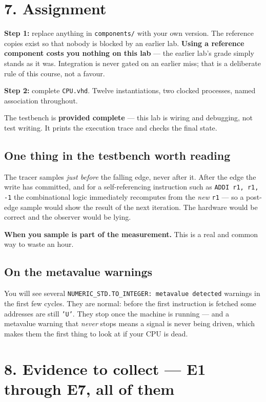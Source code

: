 \documentclass[11pt]{article}
\newcommand{\code}[1]{\texttt{#1}}
\begin{document}
\section*{7. Assignment}

\textbf{Step 1:} replace anything in \code{components/} with your own version.
The reference copies exist so that nobody is blocked by an earlier lab.
\textbf{Using a reference component costs you nothing on this lab} --- the
earlier lab's grade simply stands as it was. Integration is never gated on an
earlier miss; that is a deliberate rule of this course, not a favour.

\textbf{Step 2:} complete \code{CPU.vhd}. Twelve instantiations, two clocked
processes, named association throughout.

The testbench is \textbf{provided complete} --- this lab is wiring and
debugging, not test writing. It prints the execution trace and checks the final
state.

\subsection*{One thing in the testbench worth reading}

The tracer samples \emph{just before} the falling edge, never after it. After
the edge the write has committed, and for a self-referencing instruction such as
\code{ADDI r1, r1, -1} the combinational logic immediately recomputes from the
\emph{new} \code{r1} --- so a post-edge sample would show the result of the next
iteration. The hardware would be correct and the observer would be lying.

\textbf{When you sample is part of the measurement.} This is a real and common
way to waste an hour.

\subsection*{On the metavalue warnings}

You will see several \code{NUMERIC\_STD.TO\_INTEGER: metavalue detected}
warnings in the first few cycles. They are normal: before the first instruction
is fetched some addresses are still \code{'U'}. They stop once the machine is
running --- and a metavalue warning that \emph{never} stops means a signal is
never being driven, which makes them the first thing to look at if your CPU is
dead.

\section*{8. Evidence to collect --- E1 through E7, all of them}
\end{document}
